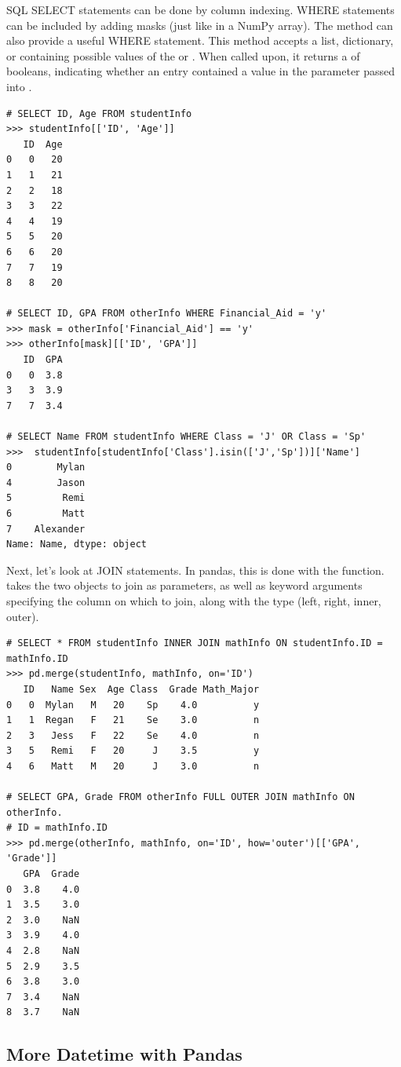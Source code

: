 SQL SELECT statements can be done by column indexing.
WHERE statements can be included by adding masks (just like in a NumPy array).
The method  can also provide a useful WHERE statement.
This method accepts a list, dictionary, or  containing possible values of the  or .
When called upon, it returns a  of booleans, indicating whether an entry contained a value in the parameter passed into .


\begin{lstlisting}
# SELECT ID, Age FROM studentInfo
>>> studentInfo[['ID', 'Age']]
   ID  Age
0   0   20
1   1   21
2   2   18
3   3   22
4   4   19
5   5   20
6   6   20
7   7   19
8   8   20

# SELECT ID, GPA FROM otherInfo WHERE Financial_Aid = 'y'
>>> mask = otherInfo['Financial_Aid'] == 'y'
>>> otherInfo[mask][['ID', 'GPA']]
   ID  GPA
0   0  3.8
3   3  3.9
7   7  3.4

# SELECT Name FROM studentInfo WHERE Class = 'J' OR Class = 'Sp'
>>>  studentInfo[studentInfo['Class'].isin(['J','Sp'])]['Name']
0        Mylan
4        Jason
5         Remi
6         Matt
7    Alexander
Name: Name, dtype: object
\end{lstlisting}

Next, let's look at JOIN statements.
In pandas, this is done with the  function.
 takes the two  objects to join as parameters, as well as keyword arguments specifying
the column on which to join, along with the type (left, right, inner, outer).

\begin{lstlisting}
# SELECT * FROM studentInfo INNER JOIN mathInfo ON studentInfo.ID = mathInfo.ID
>>> pd.merge(studentInfo, mathInfo, on='ID')
   ID   Name Sex  Age Class  Grade Math_Major
0   0  Mylan   M   20    Sp    4.0          y
1   1  Regan   F   21    Se    3.0          n
2   3   Jess   F   22    Se    4.0          n
3   5   Remi   F   20     J    3.5          y
4   6   Matt   M   20     J    3.0          n

# SELECT GPA, Grade FROM otherInfo FULL OUTER JOIN mathInfo ON otherInfo.
# ID = mathInfo.ID
>>> pd.merge(otherInfo, mathInfo, on='ID', how='outer')[['GPA', 'Grade']]
   GPA  Grade
0  3.8    4.0
1  3.5    3.0
2  3.0    NaN
3  3.9    4.0
4  2.8    NaN
5  2.9    3.5
6  3.8    3.0
7  3.4    NaN
8  3.7    NaN
\end{lstlisting}

\subsection*{More Datetime with Pandas}
